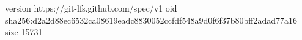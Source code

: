 version https://git-lfs.github.com/spec/v1
oid sha256:d2a2d88ec6532ca08619eadc8830052ccfdf548a9d0f6f37b80bff2adad77a16
size 15731
